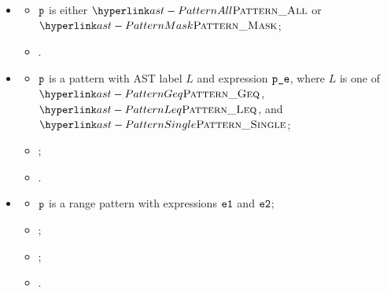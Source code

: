 \ProseParagraph
\OneApplies
\begin{itemize}
  \item {}
  \begin{itemize}
    \item $\vp$ is either $\PatternAll$ or $\PatternMask$;
    \item \Proseeqdef{$\newp$}{$\vp$}.
  \end{itemize}

  \item {}
  \begin{itemize}
    \item $\vp$ is a pattern with AST label $L$ and expression $\texttt{p\_e}$,
          where $L$ is one of $\PatternGeq$, $\PatternLeq$, and $\PatternSingle$;
    \item \Proserenamelocalsexpr{$\veone$}{$\veonep$};
    \item {}.
  \end{itemize}

  \item {}
  \begin{itemize}
    \item $\vp$ is a range pattern with expressions $\veone$ and $\vetwo$;
    \item \Proserenamelocalsexpr{$\veone$}{$\veonep$};
    \item \Proserenamelocalsexpr{$\vetwo$}{$\vetwop$};
    \item {}.
  \end{itemize}
\end{itemize}

\FormallyParagraph
\begin{mathpar}
\end{mathpar}

\begin{mathpar}
\end{mathpar}

